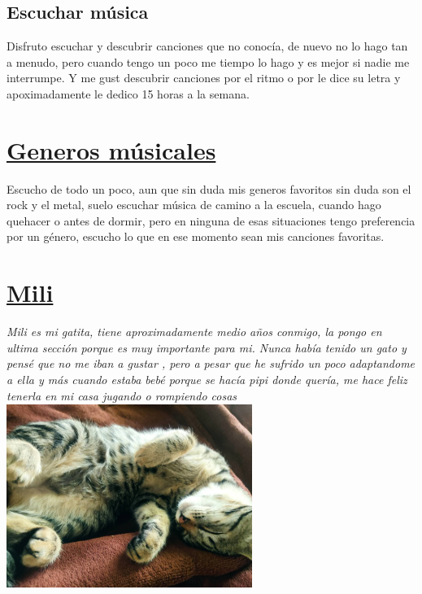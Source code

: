 \documentclass[letterpaper,12pt]{article}
\begin{document}
      \subsection{\huge{Escuchar música}}
      {\large Disfruto escuchar y descubrir canciones que no conocía, de  nuevo no lo hago tan a menudo, pero cuando tengo un poco me tiempo lo hago y es mejor si nadie me interrumpe. Y me gust descubrir canciones por el ritmo o por le dice su letra y apoximadamente le dedico 15 horas a la semana.}
\section{\underline{\huge{Generos músicales}}}
      Escucho de todo un poco, aun que sin duda mis generos favoritos sin duda son el rock y el metal, suelo escuchar música de camino a la escuela, cuando hago quehacer o antes de dormir, pero en ninguna de esas situaciones tengo preferencia por un género, escucho lo que en ese momento sean mis canciones favoritas.
\section{\underline{\huge{Mili}}}
      {\textit{Mili es mi gatita, tiene aproximadamente medio años conmigo, la pongo en ultima sección porque es muy importante para mi. Nunca había tenido un gato y pensé que no me iban a gustar , pero a pesar que he sufrido un poco adaptandome a ella y más cuando estaba bebé porque se hacía pipi donde quería, me hace feliz tenerla en mi casa jugando o rompiendo cosas}}
 \centering
\includegraphics[width=8cm, height=6cm]{Mili.jpg}
\end{document}
